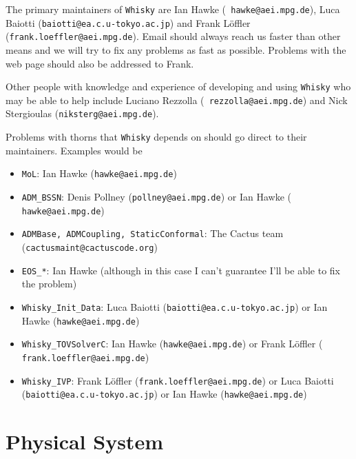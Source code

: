 \documentclass{article}
\begin{document}
The primary maintainers of {\tt Whisky} are Ian Hawke ({\tt
  hawke@aei.mpg.de}), Luca Baiotti ({\tt baiotti@ea.c.u-tokyo.ac.jp}) and Frank L\"offler
({\tt frank.loeffler@aei.mpg.de}). Email should always reach us faster than
other means and we will try to fix any problems as fast as possible.
Problems with the web page should also be addressed to Frank.

Other people with knowledge and experience of developing and using
{\tt Whisky} who may be able to help include Luciano Rezzolla ({\tt
  rezzolla@aei.mpg.de}) and Nick Stergioulas ({\tt niksterg@aei.mpg.de}).

Problems with thorns that {\tt Whisky} depends on should go direct to their
maintainers. Examples would be
\begin{itemize}
\item {\tt MoL}: Ian Hawke ({\tt hawke@aei.mpg.de})
\item {\tt ADM\_BSSN}: Denis Pollney ({\tt pollney@aei.mpg.de}) or Ian Hawke ({\tt
    hawke@aei.mpg.de})
\item {\tt ADMBase, ADMCoupling, StaticConformal}: The Cactus team
  ({\tt cactusmaint@cactuscode.org})
\item {\tt EOS\_*}: Ian Hawke (although in this case I can't guarantee
  I'll be able to fix the problem)
\item {\tt Whisky\_Init\_Data}: Luca Baiotti ({\tt baiotti@ea.c.u-tokyo.ac.jp}) or
  Ian Hawke ({\tt hawke@aei.mpg.de})
\item {\tt Whisky\_TOVSolverC}: Ian Hawke ({\tt hawke@aei.mpg.de}) or Frank L\"offler ({\tt
    frank.loeffler@aei.mpg.de})
\item {\tt Whisky\_IVP}: Frank L\"offler ({\tt frank.loeffler@aei.mpg.de}) 
  or Luca Baiotti ({\tt baiotti@ea.c.u-tokyo.ac.jp}) or Ian Hawke ({\tt hawke@aei.mpg.de})
\end{itemize}

\section{Physical System}
\label{sec:phys}
\end{document}
